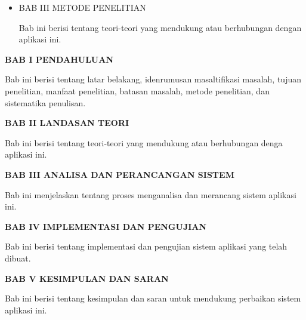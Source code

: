 \begin{flushleft}
\begin{itemize}
  \item \noindent BAB III METODE PENELITIAN
  \begin{justify}
    Bab ini berisi tentang teori-teori yang mendukung atau berhubungan dengan aplikasi ini.

  \end{justify}
\end{itemize}


 \noindent \textbf{BAB I \hspace{1cm} PENDAHULUAN}
\begin{addmargin}[2.35cm]{0em}
Bab ini berisi tentang latar belakang, idenrumusan masaltifikasi masalah, tujuan penelitian, manfaat penelitian, batasan masalah, metode penelitian, dan sistematika penulisan.
\end{addmargin}
\noindent \textbf{BAB II \hspace{0.8cm} LANDASAN TEORI}
\begin{addmargin}[2.35cm]{0em}
Bab ini berisi tentang teori-teori yang mendukung atau berhubungan denga aplikasi ini.
\end{addmargin}
\noindent \textbf{BAB III \hspace{0.7cm} ANALISA DAN PERANCANGAN SISTEM}
\begin{addmargin}[2.35cm]{0em}
Bab ini menjelaskan tentang proses menganalisa dan merancang sistem aplikasi ini.
\end{addmargin}
\noindent \textbf{BAB IV \hspace{0.7cm} IMPLEMENTASI DAN PENGUJIAN}
\begin{addmargin}[2.35cm]{0em}
Bab ini berisi tentang implementasi dan pengujian sistem aplikasi yang telah dibuat.
\end{addmargin}
\noindent \textbf{BAB V \hspace{0.8cm} KESIMPULAN DAN SARAN}
\begin{addmargin}[2.35cm]{0em}
Bab ini berisi tentang kesimpulan dan saran untuk mendukung perbaikan sistem aplikasi ini.
\end{addmargin}


\end{flushleft}



\newpage